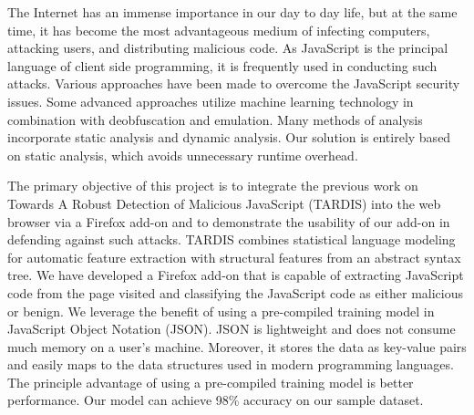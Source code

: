 The Internet has an immense importance in our day to day life, but at the same time, it has become the most advantageous medium of infecting computers, attacking users, and distributing malicious code. As JavaScript is the principal language of client side programming, it is frequently used in conducting such attacks. Various approaches have been made to overcome the JavaScript security issues. Some advanced approaches utilize machine learning technology in combination with deobfuscation and emulation. Many methods of analysis incorporate static analysis and dynamic analysis. Our solution is entirely based on static analysis, which avoids unnecessary runtime overhead.

The primary objective of this project is to integrate the previous work on Towards A Robust Detection of Malicious JavaScript (TARDIS) into the web browser via a Firefox add-on and to demonstrate the usability of our add-on in defending against such attacks. TARDIS combines statistical language modeling for automatic feature extraction with structural features from an abstract syntax tree. We have developed a Firefox add-on that is capable of extracting JavaScript code from the page visited and classifying the JavaScript code as either malicious or benign. We leverage the benefit of using a pre-compiled training model in JavaScript Object Notation (JSON). JSON is lightweight and does not consume much memory on a user's machine. Moreover, it stores the data as key-value pairs and easily maps to the data structures used in modern programming languages. The principle advantage of using a pre-compiled training model is better performance. Our model can achieve 98\% accuracy on our sample dataset.






